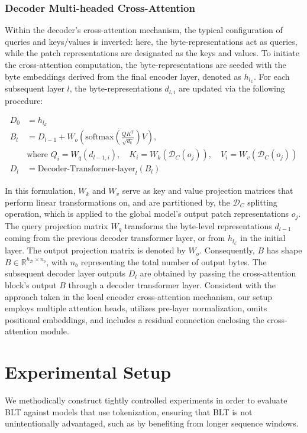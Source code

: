 \subsubsection{Decoder Multi-headed Cross-Attention} 

Within the decoder's cross-attention mechanism, the typical configuration of queries and keys/values is inverted: here, the byte-representations act as queries, while the patch representations are designated as the keys and values. To initiate the cross-attention computation, the byte-representations are seeded with the byte embeddings derived from the final encoder layer, denoted as $h_{l_{\mathcal{E}}}$. For each subsequent layer $l$, the byte-representations $d_{l,i}$ are updated via the following procedure:

\begin{align}
D_0 &= h_{l_{\mathcal{E}}} \\
B_l &= D_{l-1} + W_o\left(\text{softmax}\left(\frac{QK^T}{\sqrt{d_k}}\right)V\right), \\
  &\text{where } Q_i = W_q(d_{l-1,i}),\quad K_i = W_k(\mathcal{D}_C(o_j)),\quad V_i = W_v(\mathcal{D}_C(o_j)) \\
  D_l &= \text{Decoder-Transformer-layer}_l(B_l)
\end{align}

In this formulation, $W_k$ and $W_v$ serve as key and value projection matrices that perform linear transformations on, and are partitioned by, the $\mathcal{D}_C$ splitting operation, which is applied to the global model's output patch representations $o_j$. The query projection matrix $W_q$ transforms the byte-level representations $d_{l-1}$ coming from the previous decoder transformer layer, or from $h_{l_{\mathcal{E}}}$ in the initial layer. The output projection matrix is denoted by $W_o$. Consequently, $B$ has shape $B \in \mathbb{R}^{h_{\mathcal{D}} \times n_b}$, with $n_b$ representing the total number of output bytes. The subsequent decoder layer outputs $D_l$ are obtained by passing the cross-attention block's output $B$ through a decoder transformer layer. Consistent with the approach taken in the local encoder cross-attention mechanism, our setup employs multiple attention heads, utilizes pre-layer normalization, omits positional embeddings, and includes a residual connection enclosing the cross-attention module.

\section{Experimental Setup}
\label{section:experiments}
We methodically construct tightly controlled experiments in order to evaluate {\textsc BLT} against models that use tokenization, ensuring that {\textsc BLT} is not unintentionally advantaged, such as by benefiting from longer sequence windows.

